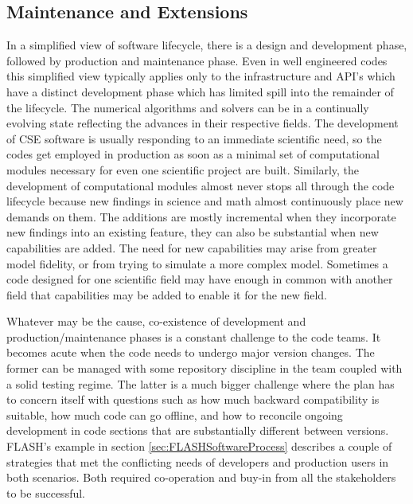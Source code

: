 \subsection{Maintenance and Extensions}
\label{sec:maintain}
In a simplified view of software lifecycle, there is a design and development phase,
followed by production and maintenance phase.  Even in well engineered
codes this simplified view typically applies only to the
infrastructure and API's which have a distinct development phase which
has limited spill into the remainder of the lifecycle. The numerical
algorithms and solvers can be in a continually evolving state
reflecting the advances in their respective fields.  
The development of CSE software is
usually responding to an immediate scientific need, so the codes get
employed in production as soon as a minimal set of computational
modules necessary for even one scientific project are
built.  Similarly, the development of computational modules almost
never stops all through the code lifecycle because new findings in science
and math almost continuously place new demands on them. The additions
are mostly incremental when they incorporate new findings into an
existing feature, they can also be substantial when new capabilities
are added. The need for new capabilities may arise from 
greater model fidelity, or from trying to simulate a more complex
model. Sometimes a code designed for one scientific field may have
enough in common with another field that capabilities may be added to
enable it for the new field.   

Whatever may be the cause, co-existence of development and
production/maintenance phases is a constant challenge to the code
teams. It becomes acute when the code needs to undergo major version
changes. The former can be managed with some repository
discipline in the team coupled with a solid testing regime. The latter
is a much bigger challenge where the plan has to concern itself with
questions such as how much backward compatibility is suitable, how
much code can go offline, and how to reconcile ongoing development in
code sections that are substantially different between versions.
FLASH's example in section \ref{sec:FLASHSoftwareProcess} describes
a couple of strategies that met the conflicting needs of developers and
production users in both scenarios. Both required co-operation and
buy-in from all the stakeholders to be successful. 


